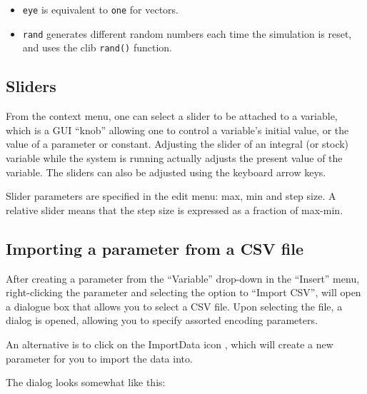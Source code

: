 \begin{itemize}
\item \verb+eye+ is equivalent to \verb+one+ for vectors.
\item \verb+rand+ generates different random numbers each time the
  simulation is reset, and uses the clib \verb+rand()+ function.
\end{itemize}


\subsection{Sliders}

From the context menu, one can select a slider to be attached to a
variable, which is a GUI ``knob'' allowing one to control a variable's
initial value, or the value of a parameter or constant. Adjusting the
slider of an integral (or stock) variable while the system is running
actually adjusts the present value of the variable. The sliders can
also be adjusted using the keyboard arrow keys.

Slider parameters are specified in the edit menu: max, min and step
size. A relative slider means that the step size is expressed as a
fraction of max-min.

\subsection{Importing a parameter from a CSV file}\label{CSV import}
\label{Operation:csvImport}

After creating a parameter from the ``Variable'' drop-down in the
``Insert'' menu, right-clicking the parameter and selecting the option
to ``Import CSV'', will open a dialogue box that allows you to select
a CSV file. Upon selecting the file, a dialog is opened, allowing you
to specify assorted encoding parameters.

An alternative is to click on the ImportData icon
, which will create a new parameter for you
to import the data into.

The dialog looks somewhat like this:

\begin{center}
\end{center}

